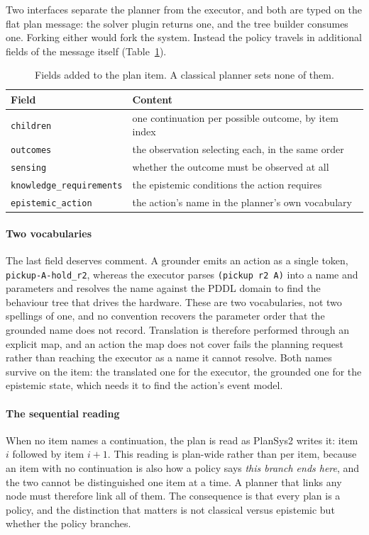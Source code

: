 \documentclass[11pt,a4paper]{article}
\theoremstyle{definition}
\newcommand{\code}[1]{\texttt{\small #1}}
\begin{document}
Two interfaces separate the planner from the executor, and both are typed on the
flat plan message: the solver plugin returns one, and the tree builder consumes
one. Forking either would fork the system. Instead the policy travels in
additional fields of the message itself (Table~\ref{tab:fields}).

\begin{table}[H]
\centering
\small
\begin{tabularx}{\textwidth}{@{}lX@{}}
\toprule
\textbf{Field} & \textbf{Content} \\
\midrule
\code{children}               & one continuation per possible outcome, by item index \\
\code{outcomes}               & the observation selecting each, in the same order \\
\code{sensing}                & whether the outcome must be observed at all \\
\code{knowledge\_requirements}& the epistemic conditions the action requires \\
\code{epistemic\_action}      & the action's name in the planner's own vocabulary \\
\bottomrule
\end{tabularx}
\caption{Fields added to the plan item. A classical planner sets none of them.}
\label{tab:fields}
\end{table}

\paragraph{Two vocabularies} The last field deserves comment. A grounder emits an
action as a single token, \code{pickup-A-hold\_r2}, whereas the executor parses
\code{(pickup r2 A)} into a name and parameters and resolves the name against the
PDDL domain to find the behaviour tree that drives the hardware. These are two
vocabularies, not two spellings of one, and no convention recovers the parameter
order that the grounded name does not record. Translation is therefore performed
through an explicit map, and an action the map does not cover fails the planning
request rather than reaching the executor as a name it cannot resolve. Both names
survive on the item: the translated one for the executor, the grounded one for
the epistemic state, which needs it to find the action's event model.

\paragraph{The sequential reading} When no item names a continuation, the plan is
read as PlanSys2 writes it: item $i$ followed by item $i+1$. This reading is
plan-wide rather than per item, because an item with no continuation is also how
a policy says \emph{this branch ends here}, and the two cannot be distinguished
one item at a time. A planner that links any node must therefore link all of
them. The consequence is that every plan is a policy, and the distinction that
matters is not classical versus epistemic but whether the policy branches.
\end{document}
